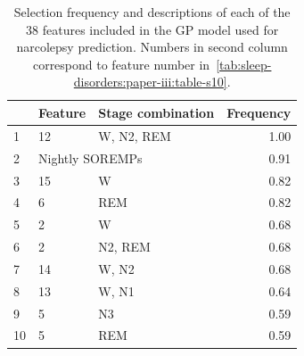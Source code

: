 \begin{table}[htbp]
    \small
    \begin{threeparttable}
    \caption[Narcolepsy features selection frequencies]{Selection frequency and descriptions of each of the 38 features included in the \acl{GP} model used for narcolepsy prediction. Numbers in second column correspond to feature number in~\cref{tab:sleep-disorders:paper-iii:table-s10}.}
    \label{tab:paperiii-supptable05}
    \begin{tabular}{@{}lp{6cm}lr@{}}
        \toprule
           & \textbf{Feature}                                                & \textbf{Stage combination}  & \textbf{Frequency} \\ \midrule
        1  & 12                                                     & \ac{W}, \ac{N2}, \ac{REM}             & 1.00                         \\
        2  & \multicolumn{2}{l}{Nightly \acp{SOREMP}}                                                       & 0.91                         \\
        3  & 15                                                     & \ac{W}                                & 0.82                         \\
        4  & 6                                                      & \ac{REM}                              & 0.82                         \\
        5  & 2                                                      & \ac{W}                                & 0.68                         \\
        6  & 2                                                      & \ac{N2}, \ac{REM}                     & 0.68                         \\
        7  & 14                                                     & \ac{W}, \ac{N2}                       & 0.68                         \\
        8  & 13                                                     & \ac{W}, \ac{N1}                       & 0.64                         \\
        9  & 5                                                      & \ac{N3}                               & 0.59                         \\
        10 & 5                                                      & \ac{REM}                              & 0.59                         \\

\end{tabular}
\end{threeparttable}
\end{table}
